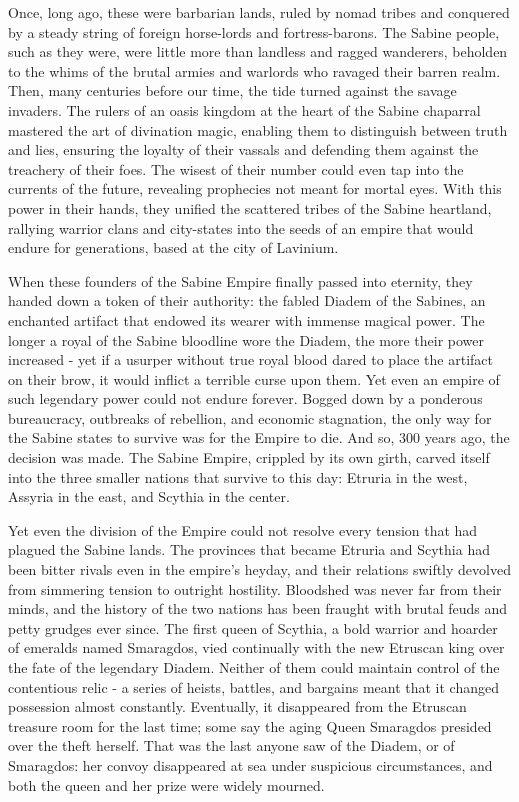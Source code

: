 \documentclass[blue]{Kos}
\begin{document}
\name{\bGeneralHistory{}}

Once, long ago, these were barbarian lands, ruled by nomad tribes and conquered by a steady string of foreign horse-lords and fortress-barons. The Sabine people, such as they were, were little more than landless and ragged wanderers, beholden to the whims of the brutal armies and warlords who ravaged their barren realm. Then, many centuries before our time, the tide turned against the savage invaders. The rulers of an oasis kingdom at the heart of the Sabine chaparral mastered the art of divination magic, enabling them to distinguish between truth and lies, ensuring the loyalty of their vassals and defending them against the treachery of their foes. The wisest of their number could even tap into the currents of the future, revealing prophecies not meant for mortal eyes. With this power in their hands, they unified the scattered tribes of the Sabine heartland, rallying warrior clans and city-states into the seeds of an empire that would endure for generations, based at the city of Lavinium. 

When these founders of the Sabine Empire finally passed into eternity, they handed down a token of their authority: the fabled Diadem of the Sabines, an enchanted artifact that endowed its wearer with immense magical power. The longer a royal of the Sabine bloodline wore the Diadem, the more their power increased - yet if a usurper without true royal blood dared to place the artifact on their brow, it would inflict a terrible curse upon them. Yet even an empire of such legendary power could not endure forever. Bogged down by a ponderous bureaucracy, outbreaks of rebellion, and economic stagnation, the only way for the Sabine states to survive was for the Empire to die. And so, 300 years ago, the decision was made. The Sabine Empire, crippled by its own girth, carved itself into the three smaller nations that survive to this day: Etruria in the west, Assyria in the east, and Scythia in the center.

Yet even the division of the Empire could not resolve every tension that had plagued the Sabine lands. The provinces that became Etruria and Scythia had been bitter rivals even in the empire's heyday, and their relations swiftly devolved from simmering tension to outright hostility. Bloodshed was never far from their minds, and the history of the two nations has been fraught with brutal feuds and petty grudges ever since. The first queen of Scythia, a bold warrior and hoarder of emeralds named Smaragdos, vied continually with the new Etruscan king over the fate of the legendary Diadem. Neither of them could maintain control of the contentious relic - a series of heists, battles, and bargains meant that it changed possession almost constantly. Eventually, it disappeared from the Etruscan treasure room for the last time; some say the aging Queen Smaragdos presided over the theft herself. That was the last anyone saw of the Diadem, or of Smaragdos: her convoy disappeared at sea under suspicious circumstances, and both the queen and her prize were widely mourned. 
\end{document}
